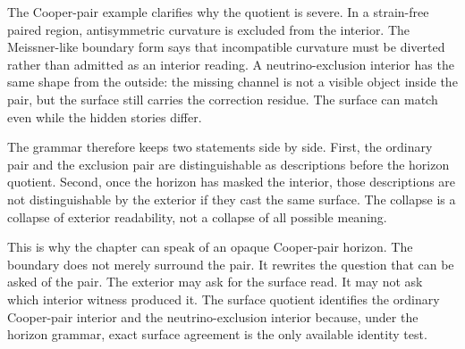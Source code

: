 The Cooper-pair example clarifies why the quotient is severe. In a
strain-free paired region, antisymmetric curvature is excluded from the
interior. The Meissner-like boundary form says that incompatible curvature
must be diverted rather than admitted as an interior reading. A
neutrino-exclusion interior has the same shape from the outside: the missing
channel is not a visible object inside the pair, but the surface still
carries the correction residue. The surface can match even while the hidden
stories differ.

The grammar therefore keeps two statements side by side. First, the
ordinary pair and the exclusion pair are distinguishable as descriptions
before the horizon quotient. Second, once the horizon has masked the
interior, those descriptions are not distinguishable by the exterior if they
cast the same surface. The collapse is a collapse of exterior readability,
not a collapse of all possible meaning.

This is why the chapter can speak of an opaque Cooper-pair horizon. The
boundary does not merely surround the pair. It rewrites the question that
can be asked of the pair. The exterior may ask for the surface read. It may
not ask which interior witness produced it. The surface quotient identifies
the ordinary Cooper-pair interior and the neutrino-exclusion interior
because, under the horizon grammar, exact surface agreement is the only
available identity test.
